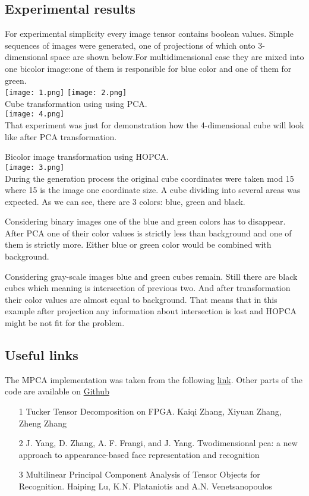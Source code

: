 \documentclass[12pt]{article}
\begin{document}
\subsection{Experimental results}
For experimental simplicity every image tensor contains boolean values. Simple sequences of images were generated, one of projections of which onto 3-dimensional space are shown below.For multidimensional case they are mixed into one bicolor image:one of them is responsible for blue color and one of them for green.\\
\texttt{[image: 1.png]}
\texttt{[image: 2.png]}
\\
Cube transformation using using PCA.\\
\texttt{[image: 4.png]}\\
That experiment was just for demonstration how the 4-dimensional cube will look like after PCA transformation. 

\newpage
Bicolor image transformation using HOPCA.\\
\texttt{[image: 3.png]}\\
During the generation process the original cube coordinates were taken mod 15 where 15 is the image one coordinate size. A cube dividing into several areas was expected. As we can see, there are 3 colors: blue, green and black.
\par 
Considering binary images one of the blue and green colors has to disappear. After PCA one of their color values is strictly less than 
background and one of them is strictly more. Either blue or green color would be combined with background.
\par 
Considering gray-scale images blue and green cubes remain. Still there are black cubes which meaning is intersection of previous two. And after transformation their color values are almost equal to background. That means that in this example after projection any information about intersection is lost and HOPCA might be not fit for the problem.   
\subsection{Useful links}
The MPCA implementation was taken from the following \href{https://www.mathworks.com/matlabcentral/fileexchange/26168-multilinear-principal-component-analysis-mpca?s_tid=mwa_osa_a}{link}. Other parts of the code are available on \href{https://github.com/PankratovViktor/MMP_Lab1}{Github}
\begin{itemize}
\item[1]{Tucker Tensor Decomposition on FPGA.
Kaiqi Zhang, Xiyuan Zhang, Zheng Zhang}
\item[2]{J. Yang, D. Zhang, A. F. Frangi, and J. Yang. Twodimensional pca: a new approach to appearance-based face
representation and recognition}
\item[3]{Multilinear Principal Component Analysis of Tensor Objects for Recognition.
Haiping Lu, K.N. Plataniotis and A.N. Venetsanopoulos
}
\end{itemize}
\end{document}
